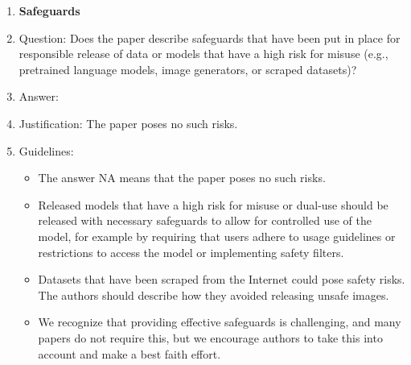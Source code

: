 \documentclass{article}
\numberwithin{equation}{section}
\theoremstyle{definition}
\begin{document}
\begin{enumerate}
\item {\bf Safeguards}
    \item[] Question: Does the paper describe safeguards that have been put in place for responsible release of data or models that have a high risk for misuse (e.g., pretrained language models, image generators, or scraped datasets)?
    \item[] Answer: \answerNA{} %
    \item[] Justification: The paper poses no such risks.
    \item[] Guidelines:
    \begin{itemize}
        \item The answer NA means that the paper poses no such risks.
        \item Released models that have a high risk for misuse or dual-use should be released with necessary safeguards to allow for controlled use of the model, for example by requiring that users adhere to usage guidelines or restrictions to access the model or implementing safety filters. 
        \item Datasets that have been scraped from the Internet could pose safety risks. The authors should describe how they avoided releasing unsafe images.
        \item We recognize that providing effective safeguards is challenging, and many papers do not require this, but we encourage authors to take this into account and make a best faith effort.
    \end{itemize}


\end{enumerate}
\end{document}
